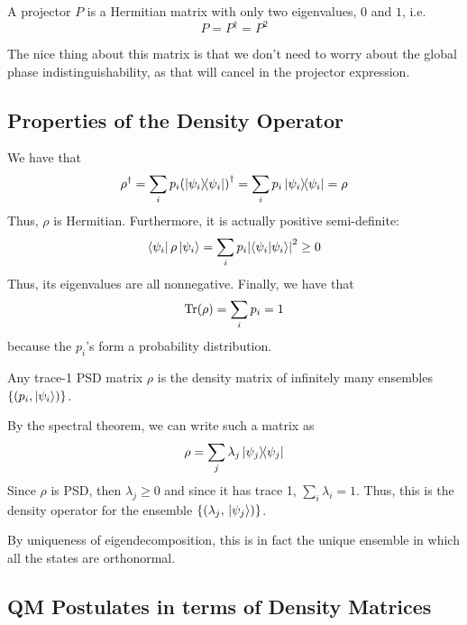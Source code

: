 \begin{definition}[Projector]
    A projector $P$ is a Hermitian matrix with only two eigenvalues, $0$ and $1$, i.e.
    \[ P = P^{\dagger} = P^2 \]
\end{definition}

The nice thing
about this matrix is that we don't need to worry about the global phase indistinguishability, as that will cancel in the
projector expression. 

\subsection{Properties of the Density Operator}

We have that
\[ \rho^{\dagger} = \sum_i p_i \qty(\ketbra{\psi_i}{\psi_i})^{\dagger} = \sum_i p_i \ketbra{\psi_i}{\psi_i} = \rho \]
Thus, $\rho$ is Hermitian. Furthermore, it is actually positive semi-definite:
\[ \bra{\psi_i} \rho \ket{\psi_i} = \sum_i p_i \qty|\braket{\psi_i}{\psi_i}|^2 \geq 0 \]
Thus, its eigenvalues are all nonnegative. Finally, we have that
\[ \Tr(\rho) = \sum_i p_i = 1 \]
because the $p_i$'s form a probability distribution.

\begin{theorem}
Any trace-1 PSD matrix $\rho$ is the density matrix of infinitely many
ensembles $\{(p_i, \ket{\psi_i})\}$.

\begin{proof*}
By the spectral theorem, we can write
such a matrix as
\[ \rho = \sum_j \lambda_j \ketbra{\psi_j}{\psi_j} \]
Since $\rho$ is PSD, then $\lambda_j \geq 0$ and since it has trace 1, $\sum_{i} \lambda_i = 1$.
Thus, this is the density operator for the ensemble $\{(\lambda_j, \ket*{\psi_j})\}$.

By uniqueness of eigendecomposition, this is in fact the unique ensemble in which all the states
are orthonormal.
\end{proof*}
\end{theorem}

\subsection{QM Postulates in terms of Density Matrices}

